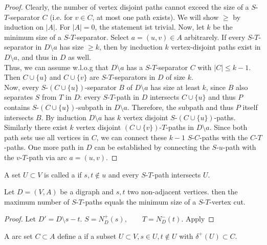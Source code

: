 \begin{proof}
Clearly, the number of vertex disjoint paths cannot exceed the size of a
$S$-$T$-separator $C$ (i.e. for $v \in C$, at most one path exists). We will
show $\geq$ by induction on $|A|$. For $|A|=0$, the statement ist trivial.
Now, let $k$ be the minimum size of a $S$-$T$-separator. Select $a=(u,v) \in
A$ arbitrarely. If every $S$-$T$-separator in $D \setminus a$ has size $\geq
k$, then by incduction $k$ vertex-disjoint paths exist in $D\setminus a$,
and thus in $D$ as well.\\
Thus, we can assume w.l.o.g that $D \setminus a $ has a $S$-$T$-separator $C$
with $|C| \leq k-1$. Then $C\cup \{u\}$ and $C\cup \{v\}$ are
$S$-$T$-separators in $D$ of size $k$.\\
Now, every $S$-$(C\cup\{u\})$-separator $B$ of $D \setminus a$ has size at
least $k$, since $B$ also separates $S$ from $T$ in $D$: every $S$-$T$-path in
$D$ intersects $C\cup\{u\}$ and thus $P$ contains $S$-$(C\cup \{u\})$-subpath
in $D\setminus a$. Therefore, the subpath and thus $P$ itself intersects
$B$. By induction $D\setminus a$ has $k$ vertex disjoint
$S$-$(C\cup\{u\})$-paths. Similarly there exist $k$ vertex disjoint
$(C\cup\{v\})$-$T$-paths in $D \setminus a$. Since both path sets use all
vertices in $C$, we can connect these $k-1$ $S$-$C$-paths with the $C$-$T$-paths.
One more path in $D$ can be established by connecting the $S$-$u$-path with
the $v$-$T$-path via arc $a=(u,v)$.
\end{proof}

\begin{defn}
A set $U\subset V$ is called a  if $s,t \notin u$
and every $S$-$T$-path intersects $U$.
\end {defn}

\begin{cor}
Let $D=(V,A)$ be a digraph and $s,t$ two non-adjacent vertices. then the
maximum number of  $S$-$T$-paths equals the
minimum size of a $S$-$T$-vertex cut.
\end{cor}
\begin{proof}
Let $D'=D\setminus s - t.$
$S=N^+_D(s), \qquad T=N_D^-(t)$. Apply %
\end{proof} 

\begin{defn}
A arc set $C\subset A$ define a  if a subset
$U\subset V, s \in U, t \notin U$ with $\delta^+(U)\subset C$.
\end{defn}


